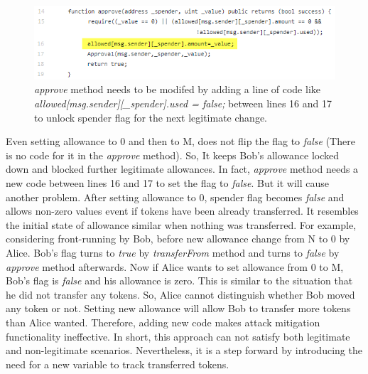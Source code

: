 \begin{figure}[t]
	\centering
	\includegraphics[width=1.0\linewidth]{figures/multiple_withdrawal_33.png}
	\caption{\textit{approve} method needs to be modifed by adding a line of code like \textit{allowed[msg.sender][\_spender].used = false;} between lines 16 and 17 to unlock spender flag for the next legitimate change.}
\end{figure}
\noindent Even setting allowance to 0 and then to M, does not flip the flag to \textit{false} (There is no code for it in the \textit{approve} method). So, It keeps Bob’s allowance locked down and blocked further legitimate allowances. In fact, \textit{approve} method needs a new code between lines 16 and 17 to set the flag to \textit{false}. But it will cause another problem. After setting allowance to 0, spender flag becomes \textit{false} and allows non-zero values event if tokens have been already transferred. It resembles the initial state of allowance similar when nothing was transferred. For example, considering front-running by Bob, before new allowance change from N to 0 by Alice. Bob's flag turns to \textit{true} by \textit{transferFrom} method and turns to \textit{false} by \textit{approve} method afterwards. Now if Alice wants to set allowance from 0 to M, Bob's flag is \textit{false} and his allowance is zero. This is similar to the situation that he did not transfer any tokens. So, Alice cannot distinguish whether Bob moved any token or not. Setting new allowance will allow Bob to transfer more tokens than Alice wanted. Therefore, adding new code makes attack mitigation functionality ineffective. In short, this approach can not satisfy both legitimate and non-legitimate scenarios. Nevertheless, it is a step forward by introducing the need for a new variable to track transferred tokens.

